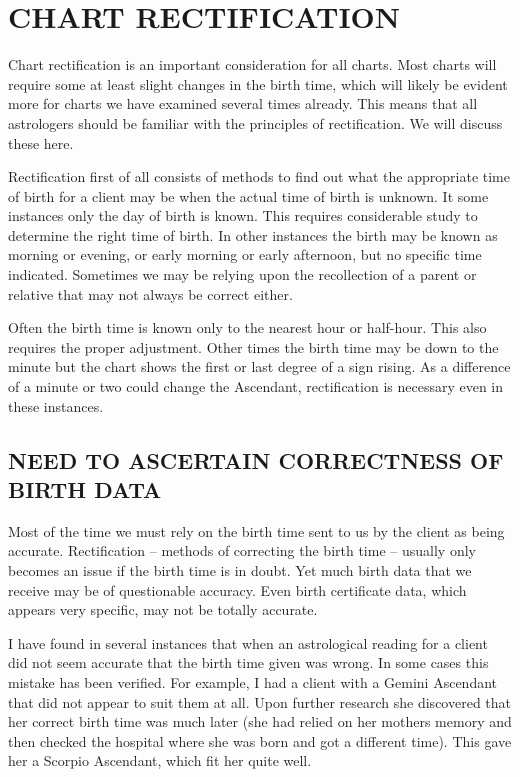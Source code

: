 \section{CHART RECTIFICATION}
 

Chart rectification is an important consideration for all charts. Most charts will require some at least slight changes in the birth time, which will likely be evident more for charts we have examined several times already. This means that all astrologers should be familiar with the principles of rectification. We will discuss these here.

 

Rectification first of all consists of methods to find out what the appropriate time of birth for a client may be when the actual time of birth is unknown. It some instances only the day of birth is known. This requires considerable study to determine the right time of birth. In other instances the birth may be known as morning or evening, or early morning or early afternoon, but no specific time indicated. Sometimes we may be relying upon the recollection of a parent or relative that may not always be correct either.

 

Often the birth time is known only to the nearest hour or half-hour. This also requires the proper adjustment. Other times the birth time may be down to the minute but the chart shows the first or last degree of a sign rising. As a difference of a minute or two could change the Ascendant, rectification is necessary even in these instances.

 



 

\subsection{NEED TO ASCERTAIN CORRECTNESS OF BIRTH DATA}

 

Most of the time we must rely on the birth time sent to us by the client as being accurate. Rectification – methods of correcting the birth time – usually only becomes an issue if the birth time is in doubt. Yet much birth data that we receive may be of questionable accuracy. Even birth certificate data, which appears very specific, may not be totally accurate.
 

I have found in several instances that when an astrological reading for a client did not seem accurate that the birth time given was wrong. In some cases this mistake has been verified. For example, I had a client with a Gemini Ascendant that did not appear to suit them at all. Upon further research she discovered that her correct birth time was much later (she had relied on her mothers memory and then checked the hospital where she was born and got a different time). This gave her a Scorpio Ascendant, which fit her quite well.


